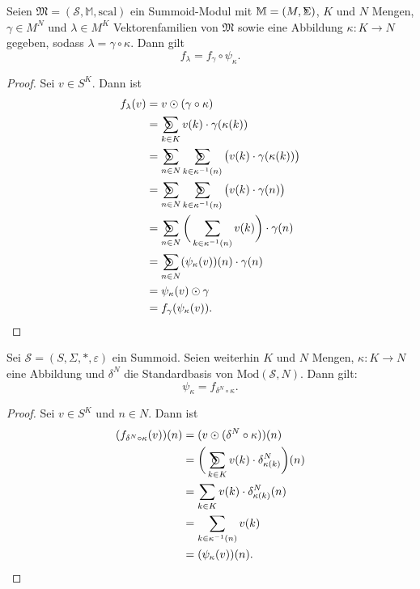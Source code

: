 \documentclass{article}
\DeclareMathOperator*{\Sigmacirc}{%
  \ThisStyle{\mathop{\ensurestackMath{\stackinset{c}{-0.75\LMpt}{c}{}{%
  \rotatebox[origin=lb]{-90}{$\circ$}}{\SavedStyle\Sigma}}}}}
\DeclareMathOperator*{\sumcirc}{%
  \ThisStyle{\mathop{\ensurestackMath{\stackinset{c}{-1.5\LMpt}{c}{}{%
  \rotatebox[origin=lb]{-90}{$\SavedStyle\scalerel*{\bm\Circle}{%
  i}$}}{\SavedStyle\sum}}}}}
\begin{document}
\begin{theorem}
  Seien $\mathfrak{M} = (\mathcal{S}, \mathbb{M}, \text{scal})$ ein Summoid-Modul
  mit $\mathbb{M} = (M, \Sigmacirc)$,
  $K$ und $N$ Mengen, $\gamma \in M^N$ und $\lambda \in M^K$
  Vektorenfamilien von $\mathfrak{M}$ sowie eine Abbildung $\kappa \colon K \to N$ gegeben,
  sodass $\lambda = \gamma \circ \kappa$.
  Dann gilt
  \begin{equation*}
    f_\lambda = f_\gamma \circ \psi_\kappa.
  \end{equation*} 
\end{theorem}
\begin{proof}
  Sei $v \in S^K$. Dann ist
  \begin{align*}
    f_\lambda(v)
    &= v \odot (\gamma \circ \kappa) \\
    &= \sumcirc_{k \in K}v(k) \cdot \gamma(\kappa(k)) \\
    &= \sumcirc_{n \in N}\sumcirc_{k \in \kappa^{-1}(n)} \big(v(k)\cdot \gamma(\kappa(k))\big) \\
    &= \sumcirc_{n \in N}\sumcirc_{k \in \kappa^{-1}(n)} \big(v(k)\cdot \gamma(n)\big) \\
    &= \sumcirc_{n \in N}\bigg(\sum_{k \in \kappa^{-1}(n)} v(k) \bigg) \cdot \gamma(n) \\
    &= \sumcirc_{n \in N}(\psi_\kappa(v))(n) \cdot \gamma(n) \\
    &=  \psi_\kappa(v) \odot \gamma \\
    &= f_\gamma(\psi_\kappa(v)).
  \end{align*}
\end{proof}

\begin{theorem}
  Sei $\mathcal{S} = (S, \Sigma, \ast, \varepsilon)$ ein Summoid.
  Seien weiterhin $K$ und $N$ Mengen, $\kappa \colon K \to N$ eine Abbildung
  und $\delta^N$ die Standardbasis von $\text{Mod}(\mathcal{S}, N)$.
  Dann gilt:
  \begin{equation*}
    \psi_\kappa = f_{\delta^N \circ \kappa}.
  \end{equation*}
\end{theorem}
\begin{proof}
  Sei $v \in S^K$ und $n \in N$. Dann ist
  \begin{align*}
    (f_{\delta^N \circ \kappa}(v))(n)
    &= (v \odot (\delta^N \circ \kappa))(n) \\
    &= \bigg(\sumcirc_{k \in K} v(k) \cdot \delta^N_{\kappa(k)}\bigg)(n) \\
    &= \sum_{k \in K} v(k) \cdot \delta^N_{\kappa(k)}(n) \\
    &= \sum_{k \in \kappa^{-1}(n)} v(k) \\
    &= (\psi_\kappa(v))(n).
  \end{align*}
\end{proof}
\end{document}
